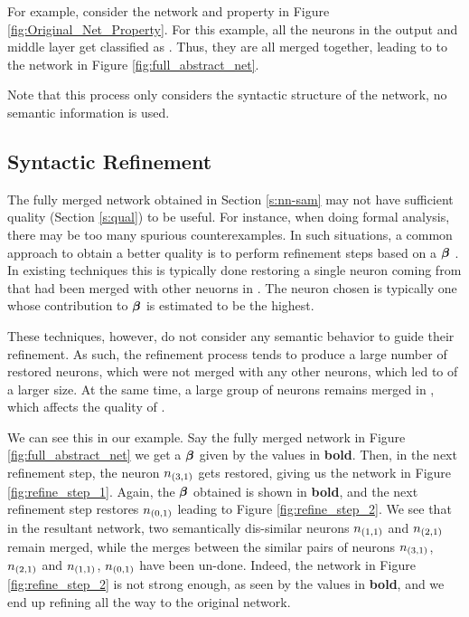 


For example, consider the network and property in Figure
\ref{fig:Original_Net_Property}. For this example, all the neurons in the output
and middle layer get classified as \inc. Thus, they are all merged together,
leading to to the network in Figure \ref{fig:full_abstract_net}.

Note that this process only considers the syntactic structure of the network, no
semantic information is used.

\subsection{ Syntactic Refinement }

The fully merged network obtained in Section \ref{s:nn-sam} may not have
sufficient quality (Section \ref{s:qual}) to be useful. For instance, when doing
formal analysis, there may be too many spurious counterexamples. In such
situations, a common approach to obtain a better quality \abs is to perform
refinement steps based on a \gencex $\boldsymbol{\beta}$ \cite{cegar-nn,
cegarette, cleverest-nn}. In
existing techniques this is typically done restoring a single neuron coming from \cnc
that had been merged with other neuorns in \abs. The neuron chosen is typically one 
whose contribution to $\boldsymbol{\beta}$ is estimated to be the highest.

These techniques, however, do not consider any semantic behavior to guide their
refinement. As such, the refinement process tends to produce a large number of
restored neurons, which were not merged with any other neurons, which led 
to \abs of a larger size. At the same time, a large group of neurons remains 
merged in \abs, which affects the quality of \abs. 

We can see this in our example. Say the fully merged network in Figure
\ref{fig:full_abstract_net} we get a $\boldsymbol{\beta}$ given by the values in \textbf{bold}.
Then, in the next refinement step, the neuron $n_{(3,1)}$ gets restored, giving
us the network in Figure \ref{fig:refine_step_1}. Again, the $\boldsymbol{\beta}$
obtained is shown in \textbf{bold}, and the next refinement step restores $n_{(0,1)}$
leading to Figure \ref{fig:refine_step_2}. We see that in the resultant network,
two semantically dis-similar neurons $n_{(1,1)}$ and $n_{(2,1)}$ remain merged,
while the merges between the similar pairs of neurons $n_{(3,1)}$, $n_{(2,1)}$
and $n_{(1,1)}$, $n_{(0,1)}$ have been un-done. Indeed, the network in Figure
\ref{fig:refine_step_2} is not strong enough, as seen by the values in \textbf{bold}, and
we end up refining all the way to the original network.



